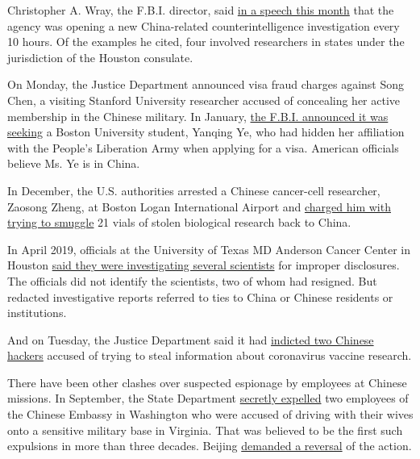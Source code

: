 Christopher A. Wray, the F.B.I. director, said
\href{https://www.fbi.gov/news/speeches/the-threat-posed-by-the-chinese-government-and-the-chinese-communist-party-to-the-economic-and-national-security-of-the-united-states}{in
a speech this month} that the agency was opening a new China-related
counterintelligence investigation every 10 hours. Of the examples he
cited, four involved researchers in states under the jurisdiction of the
Houston consulate.

On Monday, the Justice Department announced visa fraud charges against
Song Chen, a visiting Stanford University researcher accused of
concealing her active membership in the Chinese military. In January,
\href{https://www.fbi.gov/wanted/counterintelligence/yanqing-ye}{the
F.B.I. announced it was seeking} a Boston University student, Yanqing
Ye, who had hidden her affiliation with the People's Liberation Army
when applying for a visa. American officials believe Ms. Ye is in China.

In December, the U.S. authorities arrested a Chinese cancer-cell
researcher, Zaosong Zheng, at Boston Logan International Airport and
\href{https://www.justice.gov/usao-ma/pr/harvard-university-professor-and-two-chinese-nationals-charged-three-separate-china}{charged
him with trying to smuggle} 21 vials of stolen biological research back
to China.

In April 2019, officials at the University of Texas MD Anderson Cancer
Center in Houston
\href{https://www.nytimes3xbfgragh.onion/2019/04/22/health/md-anderson-chinese-scientists.html}{said
they were investigating several scientists} for improper disclosures.
The officials did not identify the scientists, two of whom had resigned.
But redacted investigative reports referred to ties to China or Chinese
residents or institutions.

And on Tuesday, the Justice Department said it had
\href{https://www.nytimes3xbfgragh.onion/2020/07/21/us/politics/china-hacking-coronavirus-vaccine.html}{indicted
two Chinese hackers} accused of trying to steal information about
coronavirus vaccine research.

There have been other clashes over suspected espionage by employees at
Chinese missions. In September, the State Department
\href{https://www.nytimes3xbfgragh.onion/2019/12/15/world/asia/us-china-spies.html}{secretly
expelled} two employees of the Chinese Embassy in Washington who were
accused of driving with their wives onto a sensitive military base in
Virginia. That was believed to be the first such expulsions in more than
three decades. Beijing
\href{https://www.nytimes3xbfgragh.onion/2019/12/16/world/asia/china-spies-explusion-military-base.html}{demanded
a reversal} of the action.

